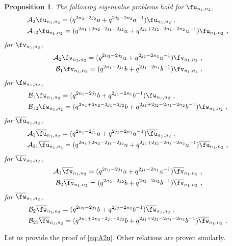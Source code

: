 \documentclass[11pt]{amsart}
\numberwithin{equation}{section}
\newtheorem{prop}[thm]{Proposition}
\numberwithin{equation}{section}
\begin{document}
\begin{prop}\label{pr:eigA2B21}  The following eigenvalue problems hold for $\fu_{n_1,n_2}$,
\begin{align}
 & \mathcal{A}_{2}  \fu_{n_1,n_2}
=(q^{2n_2-2j_2}a+q^{2j_2-2n_2}a^{-1})\fu_{n_1,n_2}\ ,\label{eq:A2u}\\
   & \mathcal{A}_{12}  \fu_{n_1,n_2}
=(q^{2n_1+2n_2-2j_1-2j_2}a+q^{2j_1+2j_2-2n_1-2n_2}a^{-1})\fu_{n_1,n_2}\ ,\label{eq:specA12}
\end{align}
for $\fv_{n_1,n_2}$,
\begin{align}
    \mathcal{A}_{2}  \fv_{n_1,n_2}
=(q^{2n_2-2j_2}a+q^{2j_2-2n_2}a^{-1})\fv_{n_1,n_2}\ ,\\
 \mathcal{B}_{1}  \fv_{n_1,n_2}
=(q^{2n_1-2j_1}b+q^{2j_1-2n_1}b^{-1})\fv_{n_1,n_2}\ ,
\end{align}
for $\fw_{n_1,n_2}$,
\begin{align}
\label{eq:B1w} &\mathcal{B}_{1}  \fw_{n_1,n_2}
=(q^{2n_1-2j_1}b+q^{2j_1-2n_1}b^{-1})\fw_{n_1,n_2}\ ,\\
\label{eq:B12w} &\mathcal{B}_{12}  \fw_{n_1,n_2}
=(q^{2n_1+2n_2-2j_1-2j_2}b+q^{2j_1+2j_2-2n_1-2n_2}b^{-1})\fw_{n_1,n_2}\ ,
\end{align}
for $\overline{\fu}_{n_1,n_2}$,
\begin{align}
 & \mathcal{A}_{1}  \overline{\fu}_{n_1,n_2}
=(q^{2n_1-2j_1}a+q^{2j_1-2n_1}a^{-1})\overline{\fu}_{n_1,n_2}\ ,\\
   & \mathcal{A}_{21}  \overline{\fu}_{n_1,n_2}
=(q^{2n_1+2n_2-2j_1-2j_2}a+q^{2j_1+2j_2-2n_1-2n_2}a^{-1})\overline{\fu}_{n_1,n_2}\ ,
\end{align}
for $\overline{\fv}_{n_1,n_2}$,
\begin{align}
    \mathcal{A}_{1}  \overline{\fv}_{n_1,n_2}
=(q^{2n_1-2j_1}a+q^{2j_1-2n_1}a^{-1})\overline{\fv}_{n_1,n_2}\ ,\\
 \mathcal{B}_{2}  \overline{\fv}_{n_1,n_2}
=(q^{2n_2-2j_2}b+q^{2j_2-2n_2}b^{-1})\overline{\fv}_{n_1,n_2}\ ,
\end{align}
for $\overline{\fw}_{n_1,n_2}$,
\begin{align}
 &\mathcal{B}_{2}  \overline{\fw}_{n_1,n_2}
=(q^{2n_2-2j_2}b+q^{2j_2-2n_2}b^{-1})\overline{\fw}_{n_1,n_2}\ ,\\
 &\mathcal{B}_{21}  \overline{\fw}_{n_1,n_2}
=(q^{2n_1+2n_2-2j_1-2j_2}b+q^{2j_1+2j_2-2n_1-2n_2}b^{-1})\overline{\fw}_{n_1,n_2}\ .\label{eq:specB21}
\end{align}
\end{prop}
\proof Let us provide the proof of \eqref{eq:A2u}. Other relations are proven similarly.
\end{document}
